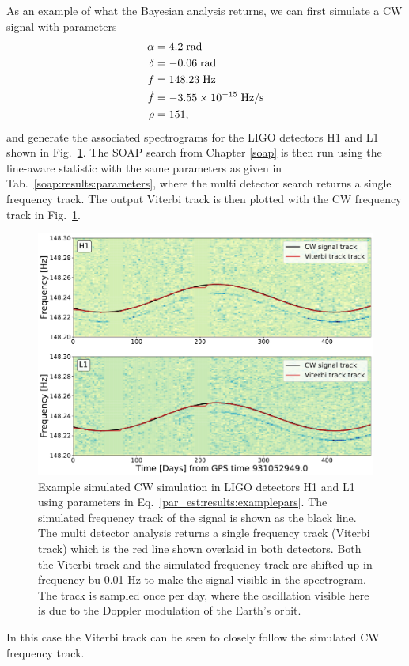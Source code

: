 As an example of what the Bayesian analysis returns, we can first simulate a \gls{CW} signal with
parameters 
%
\begin{equation}
    \label{par_est:results:examplepars}
    \begin{split}
        \alpha &= 4.2 \; \rm{rad}\\
        \delta &= -0.06 \; \rm{rad} \\
        f &= 148.23 \; \rm{Hz}\\
        \dot{f} &= -3.55 \times 10^{-15} \; \rm{Hz/s} \\
        \rho &= 151,\\
    \end{split}
\end{equation}
%
and generate the associated spectrograms for the \gls{LIGO} detectors H1 and
L1 shown in Fig.~\ref{par_est:results:freqtrack}. The SOAP search from
Chapter \ref{soap} is then run using the line-aware statistic with the same
parameters as given in Tab.~\ref{soap:results:parameters}, where the multi detector search returns a single frequency track. The output Viterbi track is then plotted with the \gls{CW} frequency track in Fig.~\ref{par_est:results:freqtrack}. 
%
\begin{figure}[ht]
    \centering
    \includegraphics[width=\linewidth]{C5_parameter/example_freqtrack.pdf}
    \caption[Frequency track of injected signal]{ Example simulated \gls{CW} simulation in \gls{LIGO} detectors H1 and L1 using parameters in Eq.~\ref{par_est:results:examplepars}. The simulated frequency track of the signal is shown as the black line. The multi detector analysis returns a single frequency track (Viterbi track) which is the red line shown overlaid in both detectors.
    Both the Viterbi track and the simulated frequency track are shifted up in frequency bu 0.01 Hz to make the signal visible in the spectrogram.
    The track is sampled once per day, where the oscillation visible here is due to the Doppler modulation of the Earth's orbit.} \label{par_est:results:freqtrack}    
\end{figure}
%
In this case the Viterbi track can be seen to closely follow the simulated
\gls{CW} frequency track.

